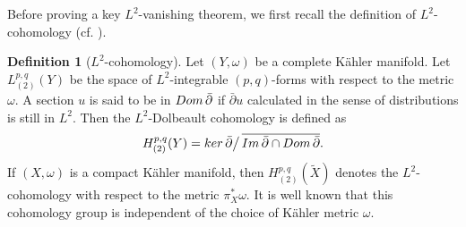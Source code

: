 \documentclass[11pt,a4paper,english]{smfart}
\theoremstyle{plain}
\theoremstyle{definition}
\newtheorem{definition}[theorem]{Definition}
\newtheorem{remark}[theorem]{Remark}
\theoremstyle{plain}
\def\db{\bar{\partial}}
\def\bC{\mathbb{C}}
\begin{document}
 
	
	
	
	
	Before proving a key $L^2$-vanishing theorem, we first recall the definition of $L^2$-cohomology (cf. \cite[Definition 12.3]{DIP02}).
	\begin{definition}[$L^2$-cohomology]\label{defn:L2} 
		Let $(Y,\omega)$ be a complete K\"ahler manifold.  Let   $L_{(2)}^{p,q}(Y)$  be the space of $L^2$-integrable   $(p,q)$-forms with respect to the metric $\omega$. A section $u$ is said to be in  ${\rm Dom}\, \db$  if  $\db u$  calculated in the sense of distributions is still in $L^2$.  Then  the $L^2$-Dolbeault cohomology is defined as
		\[ H^{p,q}_{(2)}(Y)= {{\rm ker}\, \db}\big/\,{\overline{{\rm Im}\, \db \cap {\rm Dom}\, \db}}.
		\]  
		If $(X,\omega)$ is a compact K\"ahler manifold, then 	$H^{p,q}_{(2)}(\widetilde{X})$ denotes the $L^2$-cohomology with respect to the metric $\pi_X^*\omega$. It is well known that this cohomology group is independent of the choice of Kähler metric $\omega$. 
	\end{definition} 
	
\end{document}
